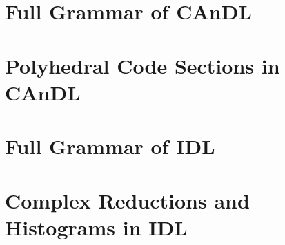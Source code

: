 \documentclass[phd,icsa,twoside,logo,11pt]{infthesis}
\begin{document}



\begin{appendices}
\chapter{Full Grammar of CAnDL}
    \label{appendix:CAnDLgrammar}
    
\chapter{Polyhedral Code Sections in CAnDL}
    \label{appendix:CAnDLpoly}
    
\chapter{Full Grammar of IDL}
    \label{appendix:IDLgrammar}
    
\chapter{Complex Reductions and Histograms in IDL}
    \label{appendix:IDLreductions}
    
\end{appendices}
\end{document}
